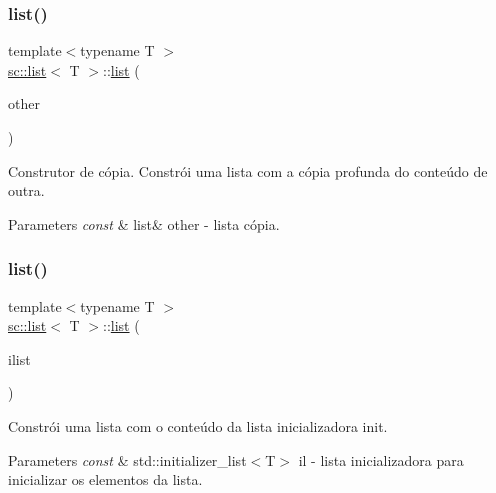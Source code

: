 \mbox{\label{classsc_1_1list_a1fe5b60798e979cb0a5b1663d64ec69b}} 
\subsubsection{\texorpdfstring{list()}{list()}\hspace{0.1cm}{\footnotesize\ttfamily [4/10]}}
{\footnotesize\ttfamily template$<$typename T $>$ \\
\mbox{\hyperlink{classsc_1_1list}{sc\+::list}}$<$ T $>$\+::\mbox{\hyperlink{classsc_1_1list}{list}} (\begin{DoxyParamCaption}\item[{const \mbox{\hyperlink{classsc_1_1list}{list}}$<$ T $>$ \&}]{other }\end{DoxyParamCaption})}

Construtor de cópia. Constrói uma lista com a cópia profunda do conteúdo de outra. 
\begin{DoxyParams}{Parameters}
{\em const} & list\& other -\/ lista cópia. \\
\hline
\end{DoxyParams}
\mbox{\label{classsc_1_1list_ae85152bcf538c929944790b1c30d3b22}} 
\subsubsection{\texorpdfstring{list()}{list()}\hspace{0.1cm}{\footnotesize\ttfamily [5/10]}}
{\footnotesize\ttfamily template$<$typename T $>$ \\
\mbox{\hyperlink{classsc_1_1list}{sc\+::list}}$<$ T $>$\+::\mbox{\hyperlink{classsc_1_1list}{list}} (\begin{DoxyParamCaption}\item[{std\+::initializer\+\_\+list$<$ T $>$}]{ilist }\end{DoxyParamCaption})}

Constrói uma lista com o conteúdo da lista inicializadora init. 
\begin{DoxyParams}{Parameters}
{\em const} & std\+::initializer\+\_\+list$<$\+T$>$ il -\/ lista inicializadora para inicializar os elementos da lista. \\
\hline
\end{DoxyParams}
\mbox{\label{classsc_1_1list_a72eaabb03a048506432f8d167db12524}} 
